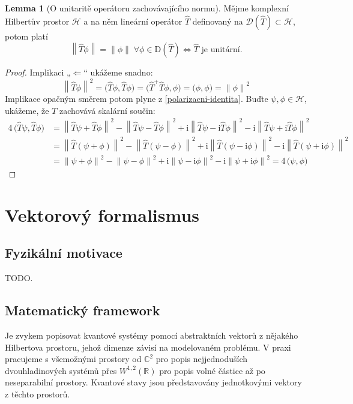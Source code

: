 \documentclass[10pt,a4paper]{article}
\theoremstyle{definition}
\newtheorem{lemma}[theorem]{Lemma}
\newcommand{\const}[1]{\mathrm{#1}}
\newcommand{\norm}[1]{\left\lVert#1\right\rVert}
\newcommand{\innerprod}[2]{\big( #1, #2 \big)}
\renewcommand{\i}{\const{i}}
\def\R{\mathbb{R}}
\def\C{\mathbb{C}}
\def\H{\mathcal{H}}
\def\domain{\mathcal{D}}
\begin{document}
\begin{lemma}[O unitaritě operátoru zachovávajícího normu]
    \label{unitarni-zachova-normu}
    Mějme komplexní Hilbertův prostor $\H$ a na něm lineární operátor $\hat T$ definovaný na $\domain(\hat T) \subset \H$, potom platí
    \begin{equation*}
        \norm{\hat T \phi} = \norm{\phi}
        \;\forall \phi \in \mathrm{D}(\hat T)
        \iff
        \hat T \text{ je unitární.}
    \end{equation*}
\end{lemma}
\begin{proof}
    Implikaci „$\Leftarrow$“ ukážeme snadno:
    \begin{equation*}
        \norm{\hat T \phi}^2
        = \innerprod{\hat T \phi}{\hat T \phi}
        = \innerprod{\hat T^+ \hat T \phi}{\phi}
        = \innerprod{\phi}{\phi}
        = \norm{\phi}^2
    \end{equation*}
    Implikace opačným směrem potom plyne z \ref{polarizacni-identita}. Buďte $\psi, \phi \in \H$, ukážeme, že $T$ zachovává skalární součin:
    \begin{align*}
        4 \, \innerprod{\hat T \psi}{\hat T \phi}
        &= \norm{\hat T \psi + \hat T \phi}^2
        - \norm{\hat T \psi - \hat T \phi}^2
        + \i \norm{\hat T \psi - \i \hat T \phi}^2
        - \i \norm{\hat T \psi + \i \hat T \phi}^2
        \\[10pt]
        &= \norm{\hat T(\psi + \phi)}^2
        - \norm{\hat T(\psi - \phi)}^2
        + \i \norm{\hat T(\psi - \i \phi)}^2
        - \i \norm{\hat T(\psi + \i \phi)}^2
        \\[10pt]
        &= \norm{\psi + \phi}^2
        - \norm{\psi - \phi}^2
        + \i \norm{\psi - \i \phi}^2
        - \i \norm{\psi + \i \phi}^2
        = 4 \, \innerprod{\psi}{\phi}
    \end{align*}
\end{proof}


\section{Vektorový formalismus}

\subsection{Fyzikální motivace}
TODO.

\subsection{Matematický framework}
Je zvykem popisovat kvantové systémy pomocí abstraktních vektorů z nějakého Hilbertova prostoru, jehož dimenze závisí na modelovaném problému. V praxi pracujeme s všemožnými prostory od $\C^2$ pro popis nejjednoduších dvouhladinových systémů přes $W^{1,2}(\R)$ pro popis volné částice až po neseparabilní prostory. Kvantové stavy jsou představovány jednotkovými vektory z těchto prostorů.
\end{document}
